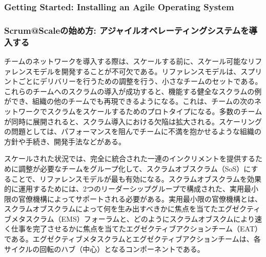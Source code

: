 \documentclass[12pt,a4paper,parskip=full]{scrartcl}
\begin{document}
\subsubsection{Getting Started: Installing an Agile Operating
System}\label{getting-started-installing-an-agile-operating-system}
\fi
\subsubsection{Scrum@Scaleの始め方: アジャイルオペレーティングシステムを導入する}\label{getting-started-installing-an-agile-operating-system}

チームのネットワークを導入する際は、スケールする前に、スケール可能なリファレンスモデルを開発することが不可欠である。リファレンスモデルは、スプリントごとにデリバリーを行うための調整を行う、小さなチームのセットである。これらのチームへのスクラムの導入が成功すると、機能する健全なスクラムの例ができ、組織の他のチームでも再現できるようになる。これは、チームの次のネットワークでスクラムをスケールするためのプロトタイプになる。多数のチームが同時に展開されると、スクラム導入における欠陥は拡大される。スケーリングの問題としては、パフォーマンスを阻んでチームに不満を抱かせるような組織の方針や手続き、開発手法などがある。

スケールされた状況では、完全に統合された一連のインクリメントを提供するために調整が必要なチームをグループ化して、スクラムオブスクラム（SoS）にすることで、リファレンスモデルが最も有効になる。スクラムオブスクラムを効果的に運用するためには、2つのリーダーシップグループで構成された、実用最小限の官僚機構によってサポートされる必要がある。実用最小限の官僚機構とは、スクラムオブスクラムによって何を生み出すべきかに焦点を当てたエグゼクティブメタスクラム（EMS）フォーラムと、どのようにスクラムオブスクムにより速く仕事を完了させるかに焦点を当てたエグゼクティブアクションチーム（EAT）である。エグゼクティブメタスクラムとエグゼクティブアクションチームは、各サイクルの回転のハブ（中心）となるコンポーネントである。
\end{document}
